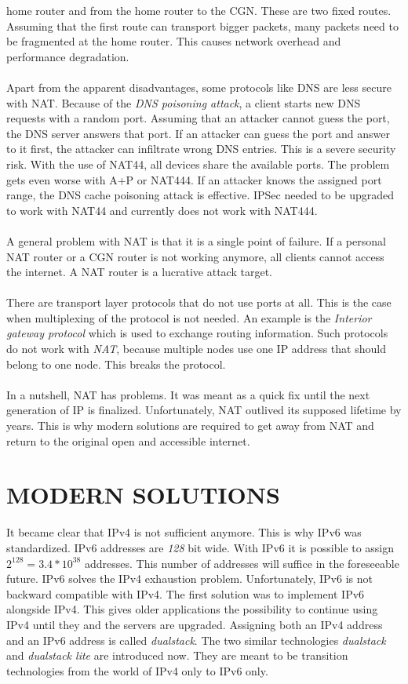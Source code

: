 \documentclass[format=sigconf, natbib=true, nonacm=true]{acmart}
\begin{document}
home router and from the home router to the CGN. These are two fixed routes. Assuming that the first route can transport bigger packets, many packets need to be fragmented at the home router. This causes network overhead and performance degradation.\\\\Apart from the apparent disadvantages, some protocols like DNS are less secure with NAT. Because of the \textit{DNS poisoning attack}, a client starts new DNS requests with a random port. Assuming that an attacker cannot guess the port, the DNS server answers that port. If an attacker can guess the port and answer to it first, the attacker can infiltrate wrong DNS entries. This is a severe security risk. With the use of NAT44, all devices share the available ports. The problem gets even worse with A+P or NAT444. If an attacker knows the assigned port range, the DNS cache poisoning attack is effective. IPSec needed to be upgraded to work with NAT44 and currently does not work with NAT444\cite{Hughes2022_C04}.\\\\A general problem with NAT is that it is a single point of failure. If a personal NAT router or a CGN router is not working anymore, all clients cannot access the internet. A NAT router is a lucrative attack target\cite{Hughes2022_C04}.\\\\There are transport layer protocols that do not use ports at all. This is the case when multiplexing of the protocol is not needed. An example is the \textit{Interior gateway protocol} which is used to exchange routing information. Such protocols do not work with \textit{NAT}, because multiple nodes use one IP address that should belong to one node. This breaks the protocol.\\\\In a nutshell, NAT has problems. It was meant as a quick fix until the next generation of IP is finalized. Unfortunately, NAT outlived its supposed lifetime by years. This is why modern solutions are required to get away from NAT and return to the original open and accessible internet.
    \section{MODERN SOLUTIONS}
    It became clear that IPv4 is not sufficient anymore. This is why IPv6 was standardized. IPv6 addresses are \textit{128} bit wide. With IPv6 it is possible to assign $2^{128}=3.4*10^{38}$ addresses. This number of addresses will suffice in the foreseeable future. IPv6 solves the IPv4 exhaustion problem. Unfortunately, IPv6 is not backward compatible with IPv4. The first solution was to implement IPv6 alongside IPv4. This gives older applications the possibility to continue using IPv4 until they and the servers are upgraded. Assigning both an IPv4 address and an IPv6 address is called \textit{dualstack}. The two similar technologies \textit{dualstack} and \textit{dualstack lite} are introduced now. They are meant to be transition technologies from the world of IPv4 only to IPv6 only.
\end{document}
